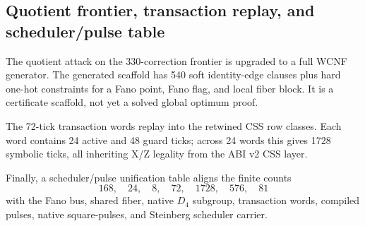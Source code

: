 \subsection{Quotient frontier, transaction replay, and scheduler/pulse table}
\label{sec:bt1498-bt1500-wcnf-css-unification}

The quotient attack on the 330-correction frontier is upgraded to a full WCNF
generator.  The generated scaffold has 540 soft identity-edge clauses plus hard
one-hot constraints for a Fano point, Fano flag, and local fiber block.  It is a
certificate scaffold, not yet a solved global optimum proof.

The 72-tick transaction words replay into the retwined CSS row classes.  Each
word contains 24 active and 48 guard ticks; across 24 words this gives 1728
symbolic ticks, all inheriting X/Z legality from the ABI v2 CSS layer.

Finally, a scheduler/pulse unification table aligns the finite counts
\[
168,\quad 24,\quad 8,\quad 72,\quad 1728,\quad 576,\quad 81
\]
with the Fano bus, shared fiber, native \(D_4\) subgroup, transaction words,
compiled pulses, native square-pulses, and Steinberg scheduler carrier.
